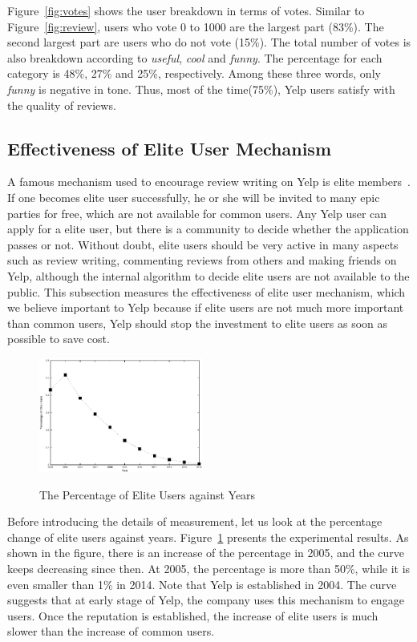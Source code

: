 \documentclass[10pt]{sig-alternate-10pt}   	%
\begin{document}
Figure~\ref{fig:votes} shows the user breakdown in terms of votes.  Similar to Figure~\ref{fig:review}, users who 
vote 0 to 1000 are the largest part (83\%). The second largest part are users who do not vote (15\%). The 
total number of votes is also breakdown according to \textit{useful}, \textit{cool} and \textit{funny}. The percentage 
for each category is 48\%, 27\% and 25\%, respectively.  Among these three words, only \textit{funny} is 
negative in tone. Thus, most of the time(75\%), Yelp users satisfy with the quality of reviews. 

\subsection{Effectiveness of Elite User Mechanism}
A famous mechanism used to encourage review writing on Yelp is elite members~\cite{elite}. If one becomes
elite user successfully, he or she will be invited to many epic parties for free, which are not available for common 
users. Any Yelp user can apply for a elite user, but there is a  community to decide whether the application passes 
or not. Without doubt, elite users should be very active in many aspects such as review writing, commenting 
reviews from others and making friends on Yelp, although the internal algorithm to decide elite users are not
available to the public.  This subsection measures the effectiveness of elite user mechanism, which we believe 
important to Yelp because if elite users are not much more important than common users, Yelp should stop the 
investment to elite users as soon as possible to save cost.  

\begin{figure}[t]
  \centering
  \caption{The Percentage of Elite Users against Years} 
       \includegraphics[width=0.48\textwidth]{figures/elite.eps}
  \label{fig:elite}
\end{figure} 
Before introducing the details of measurement, let us look at the percentage change of elite users against years.
Figure~\ref{fig:elite} presents the experimental results. As shown in the figure, there is an increase of the percentage 
in 2005, and the curve keeps decreasing since then. At 2005, the percentage is more than 50\%, while it is 
even smaller than 1\% in 2014. Note that Yelp is established in 2004. The curve suggests that at early stage of 
Yelp, the company uses this mechanism to engage users. Once the reputation is established, the increase of 
elite users is much slower than the increase of common users. 
\end{document}
